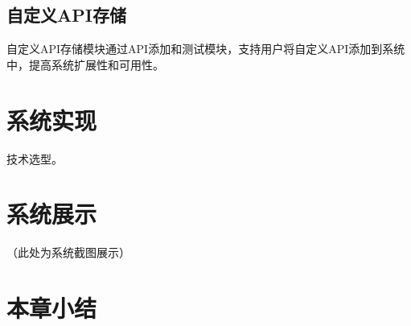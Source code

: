 \subsection{自定义API存储}
自定义API存储模块通过API添加和测试模块，支持用户将自定义API添加到系统中，提高系统扩展性和可用性。

\section{系统实现}

技术选型。

\section{系统展示}
（此处为系统截图展示）

\section{本章小结}